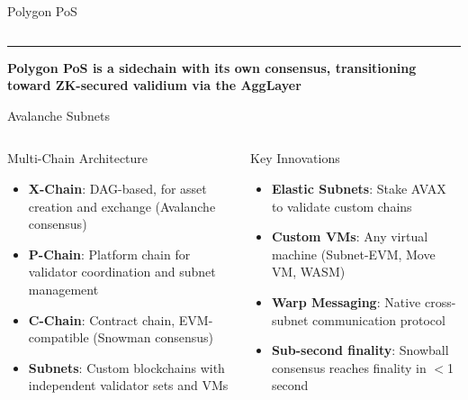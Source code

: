 \documentclass[8pt,aspectratio=169]{beamer}
\newcommand{\bottomnote}[1]{\vfill\vspace{-2mm}\textcolor{mllavender2}{\rule{\textwidth}{0.4pt}}\vspace{1mm}\footnotesize\textbf{#1}}
\begin{document}
\begin{frame}{Polygon PoS}
\begin{columns}[T]
\end{columns}
\bottomnote{Polygon PoS is a sidechain with its own consensus, transitioning toward ZK-secured validium via the AggLayer}
\end{frame}

\begin{frame}{Avalanche Subnets}
\vspace{-1mm}
\begin{columns}[T]
\begin{block}{Multi-Chain Architecture}
\footnotesize
\begin{itemize}\setlength\itemsep{3pt}
  \item \textbf{X-Chain}: DAG-based, for asset creation and exchange (Avalanche consensus)
  \item \textbf{P-Chain}: Platform chain for validator coordination and subnet management
  \item \textbf{C-Chain}: Contract chain, EVM-compatible (Snowman consensus)
  \item \textbf{Subnets}: Custom blockchains with independent validator sets and VMs
\end{itemize}
\end{block}
\vspace{2mm}
\begin{block}{Key Innovations}
\footnotesize
\begin{itemize}
  \item \textbf{Elastic Subnets}: Stake AVAX to validate custom chains
  \item \textbf{Custom VMs}: Any virtual machine (Subnet-EVM, Move VM, WASM)
  \item \textbf{Warp Messaging}: Native cross-subnet communication protocol
  \item \textbf{Sub-second finality}: Snowball consensus reaches finality in $<$1 second
\end{itemize}
\end{block}
\vspace{1mm}
\end{columns}
\end{frame}
\end{document}
